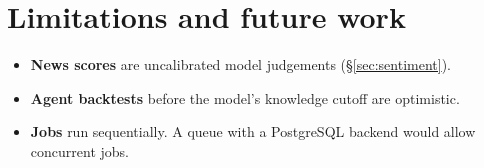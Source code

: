 \documentclass[11pt,a4paper]{article}
\begin{document}
\section{Limitations and future work}\label{sec:limitations}
\begin{itemize}
  \item \textbf{News scores} are uncalibrated model judgements (\S\ref{sec:sentiment}).
  \item \textbf{Agent backtests} before the model's knowledge cutoff are optimistic.
  \item \textbf{Jobs} run sequentially. A queue with a PostgreSQL backend would allow
        concurrent jobs.
\end{itemize}
\end{document}
